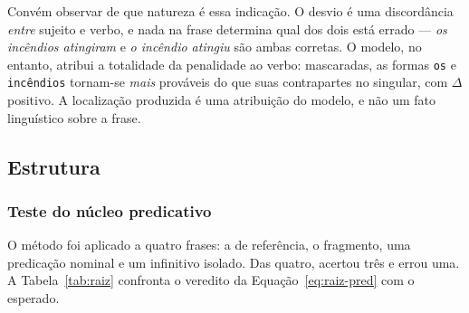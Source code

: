 Convém observar de que natureza é essa indicação. O desvio é uma discordância \emph{entre}
sujeito e verbo, e nada na frase determina qual dos dois está errado --- \emph{os incêndios
atingiram} e \emph{o incêndio atingiu} são ambas corretas. O modelo, no entanto, atribui a
totalidade da penalidade ao verbo: mascaradas, as formas \texttt{os} e \texttt{incêndios}
tornam-se \emph{mais} prováveis do que suas contrapartes no singular, com $\Delta$ positivo.
A localização produzida é uma atribuição do modelo, e não um fato linguístico sobre a frase.

\subsection{Estrutura}
\label{res:estrutura}

\subsubsection{Teste do núcleo predicativo}
\label{res:raiz}

O método foi aplicado a quatro frases: a de referência, o fragmento, uma predicação nominal e
um infinitivo isolado. Das quatro, acertou três e errou uma. A Tabela~\ref{tab:raiz}
confronta o veredito da Equação~\ref{eq:raiz-pred} com o esperado.

\begin{table}[H]
\centering
{}
\caption{O teste da raiz sobre quatro frases, com o veredito confrontado ao esperado.}
\label{tab:raiz}
\end{table}

